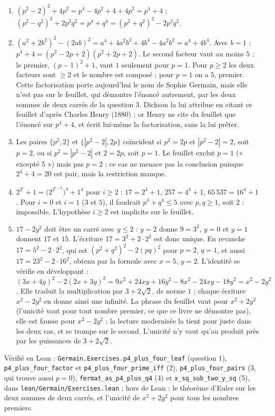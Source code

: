 \documentclass[11pt,a4paper]{article}
\begin{document}
\begin{solution}
\begin{enumerate}
\item $(p^2 - 2)^2 + 4p^2 = p^4 - 4p^2 + 4 + 4p^2 = p^4 + 4$ ;
  $(p^2 - q^2)^2 + 2p^2q^2 = p^4 + q^4 = (p^2 + q^2)^2 - 2p^2q^2$.
\item $(a^2 + 2b^2)^2 - (2ab)^2 = a^4 + 4a^2b^2 + 4b^4 - 4a^2b^2 = a^4 + 4b^4$. Avec
  $b = 1$ : $p^4 + 4 = (p^2 - 2p + 2)(p^2 + 2p + 2)$. Le second facteur vaut au moins
  $5$ ; le premier, $(p-1)^2 + 1$, vaut $1$ seulement pour $p = 1$. Pour $p \ge 2$
  les deux facteurs sont $\ge 2$ et le nombre est composé ; pour $p = 1$ on a $5$,
  premier. Cette factorisation porte aujourd'hui le nom de Sophie Germain, mais elle
  n'est pas sur le feuillet, qui démontre l'énoncé autrement, par les deux sommes de
  deux carrés de la question 3. Dickson la lui attribue en citant ce feuillet d'après
  Charles Henry (1880) ; or Henry ne cite du feuillet que l'énoncé sur $p^4 + 4$, et
  écrit lui-même la factorisation, sans la lui prêter.
\item Les paires $\{p^2, 2\}$ et $\{|p^2 - 2|, 2p\}$ coïncident si $p^2 = 2p$ et
  $|p^2 - 2| = 2$, soit $p = 2$, ou si $p^2 = |p^2 - 2|$ et $2 = 2p$, soit $p = 1$.
  Le feuillet exclut $p = 1$ (« excepté 5 ») mais pas $p = 2$ ; ce cas ne menace pas
  la conclusion puisque $2^4 + 4 = 20$ est pair, mais la restriction manque.
\item $2^{2^i} + 1 = \bigl(2^{2^{i-2}}\bigr)^4 + 1^4$ pour $i \ge 2$ : $17 = 2^4 + 1$,
  $257 = 4^4 + 1$, $65\,537 = 16^4 + 1$. Pour $i = 0$ et $i = 1$ ($3$ et $5$), il
  faudrait $p^4 + q^4 \le 5$ avec $p, q \ge 1$, soit $2$ : impossible. L'hypothèse
  $i \ge 2$ est implicite sur le feuillet.
\item $17 - 2y^2$ doit être un carré avec $y \le 2$ : $y = 2$ donne $9 = 3^2$, $y = 0$
  et $y = 1$ donnent $17$ et $15$. L'écriture $17 = 3^2 + 2\cdot2^2$ est donc unique.
  En revanche $17 = 5^2 - 2\cdot2^2$, qui est $(p^2+q^2)^2 - 2(pq)^2$ pour $p = 2$,
  $q = 1$, et aussi $17 = 23^2 - 2\cdot16^2$, obtenu par la formule avec $x = 5$,
  $y = 2$. L'identité se vérifie en développant :
  $(3x+4y)^2 - 2(2x+3y)^2 = 9x^2 + 24xy + 16y^2 - 8x^2 - 24xy - 18y^2 = x^2 - 2y^2$.
  Elle traduit la multiplication par $3 + 2\sqrt2$, de norme $1$ ; chaque écriture
  $x^2 - 2y^2$ en donne ainsi une infinité. La phrase du feuillet vaut pour
  $x^2 + 2y^2$ (l'unicité vaut pour tout nombre premier, ce que ce livre ne démontre
  pas), elle est fausse pour $x^2 - 2y^2$ ; la lecture modernisée la tient pour
  juste dans les deux cas, et se trompe sur le second. L'unicité n'y vaut qu'au
  produit près par les puissances de $3 + 2\sqrt2$.
\end{enumerate}

Vérifié en Lean : \texttt{Germain.Exercises.p4\_plus\_four\_leaf} (question 1),
\texttt{p4\_plus\_four\_factor} et \texttt{p4\_plus\_four\_prime\_iff} (2),
\texttt{p4\_plus\_four\_pairs} (3, qui trouve aussi $p = 0$),
\texttt{fermat\_as\_p4\_plus\_q4} (4) et \texttt{x\_sq\_sub\_two\_y\_sq} (5), dans
\texttt{lean/Germain/Exercises.lean} ; hors de Lean : le théorème d'Euler sur les deux sommes de deux carrés,
et l'unicité de $x^2 + 2y^2$ pour tous les nombres premiers.
\end{solution}
\end{document}
